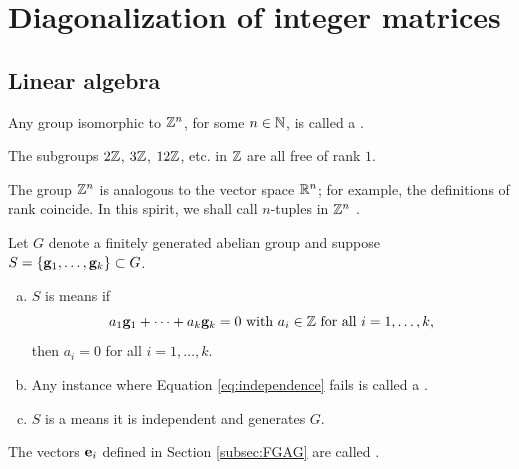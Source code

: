\documentclass[../algebraNotesMSRI-UP2016.tex]{subfiles}
\begin{document}
\section[\S \thesection]{Diagonalization of integer matrices}\label{sec:2p9diagonalizationOfIntegerMatrices}
\subsection[\subsecname]{Linear algebra}\label{subsec:linearAlgebra}
\begin{frame}{\subsecname}
\begin{dfn}
Any group isomorphic to $\mathbb Z^n$, for some $n\in\mathbb N$, is called a .
\end{dfn}

\smallGap
\begin{ex}
The subgroups $2\mathbb Z$, $3\mathbb Z$, $12\mathbb Z$, etc. in $\mathbb Z$ are all free of rank $1$.
\end{ex}

\smallGap
The group $\mathbb Z^n$ is analogous to the vector space $\mathbb R^n$; for example, the definitions of rank coincide.  In this spirit, we shall call $n$-tuples in $\mathbb Z^n$ .
\end{frame}

\begin{frame}{}{}
\begin{dfn}%
Let $G$ denote a finitely generated abelian group and suppose $S=\{\mathbf g_1,\dots,\mathbf g_k\}\subset G$.
\begin{enumerate}[(a)]
\item $S$ is  means if  
\begin{equation}\label{eq:independence}
a_1\mathbf g_1+\cdots+a_k\mathbf g_k=0\text{ with $a_i\in \mathbb Z$ for all $i=1,\dots,k$},
\end{equation}
then $a_i=0$ for all $i=1,\dots, k$.  
\item Any instance where Equation \eqref{eq:independence} fails is called a .
\item $S$ is a  means it is independent and generates $G$.
\end{enumerate}
\end{dfn}

\smallGap
The vectors $\mathbf e_i$ defined in Section \ref{subsec:FGAG} are called .  
\end{frame}
\end{document}
